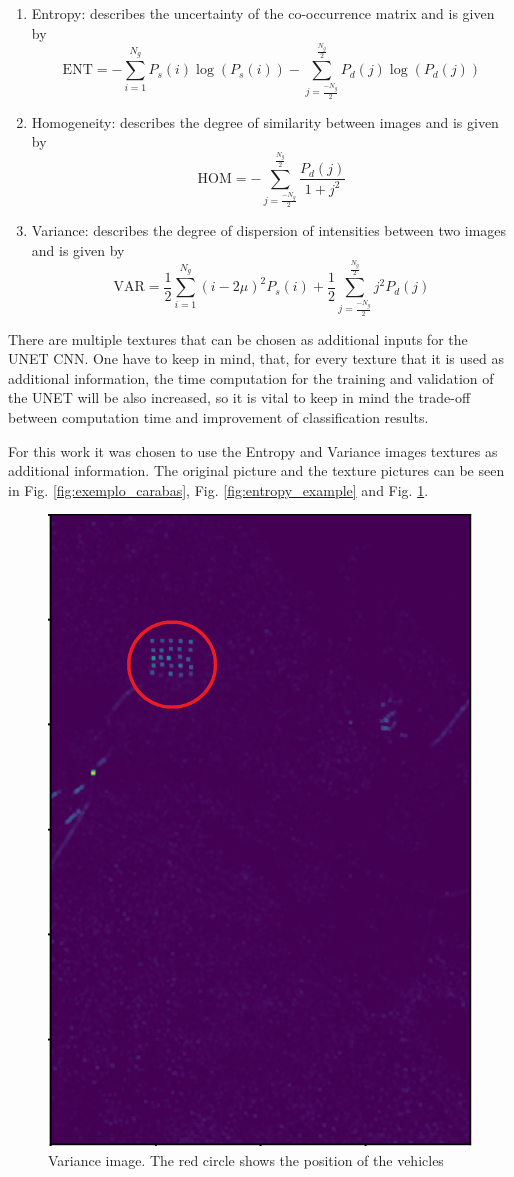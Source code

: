 \begin{enumerate}
    \item Entropy: describes the uncertainty of the co-occurrence matrix and is given by
    \begin{equation}
        \textrm{ENT} = -\sum_{i=1}^{N_g}P_s(i)\log(P_s(i)) - \sum_{j=\frac{-N_g}{2}}^{\frac{N_g}{2}} P_d(j)\log(P_d(j))
    \end{equation}
    
    \item Homogeneity: describes the degree of similarity between images and is given by
    \begin{equation}
        \textrm{HOM} = - \sum_{j=\frac{-N_g}{2}}^{\frac{N_g}{2}} \frac{P_d(j)}{1+j^2}
    \end{equation}
    
    \item Variance: describes the degree of dispersion of intensities between two images and is given by
    \begin{equation}
        \textrm{VAR} = \frac{1}{2} \sum_{i=1}^{N_g}(i-2\mu)^2 P_s(i) + 
         \frac{1}{2}\sum_{j=\frac{-N_g}{2}}^{\frac{N_g}{2}} j^2 P_d(j)
    \end{equation}
\end{enumerate}

There are multiple textures that can be chosen as additional inputs for the UNET CNN. One have to keep in mind, that, for every texture that it is used as additional information, 
the time computation for the training and validation of the UNET will be also increased, so it is vital to keep in mind the trade-off between computation time and improvement of classification results.

For this work it was chosen to use the Entropy and Variance images textures as additional information. The original picture and the texture pictures can be seen in Fig. \ref{fig:exemplo_carabas}, Fig. \ref{fig:entropy_example} and Fig. \ref{fig:variance_example}.



\begin{figure}[ht]
    \centering
    \includegraphics[width=0.45\linewidth]{Chapter7/variance_exemplo.png}
    \caption{Variance image. The red circle shows the position of the vehicles}
    \label{fig:variance_example}
\end{figure}

